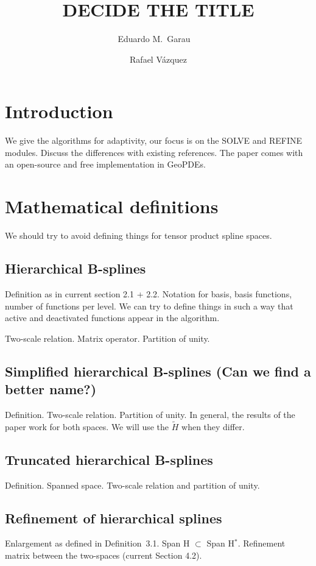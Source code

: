 \documentclass[a4paper]{siamltex1213}
\title{DECIDE THE TITLE}
\author{Eduardo M.~Garau\footnotemark[1]\ \footnotemark[2]\ \footnotemark[3] \and Rafael V\'azquez\footnotemark[1]}
\begin{document}
\maketitle

\renewcommand{\thefootnote}{\fnsymbol{footnote}}
\renewcommand{\thefootnote}{\arabic{footnote}}

\section{Introduction}
We give the algorithms for adaptivity, our focus is on the SOLVE and REFINE modules. Discuss the differences with existing references. The paper comes with an open-source and free implementation in GeoPDEs.

\section{Mathematical definitions}
We should try to avoid defining things for tensor product spline spaces.
\subsection{Hierarchical B-splines}
Definition as in current section 2.1 + 2.2. Notation for basis, basis functions, number of functions per level. We can try to define things in such a way that active and deactivated functions appear in the algorithm.

Two-scale relation. Matrix operator. Partition of unity.
\subsection{Simplified hierarchical B-splines (Can we find a better name?)}
Definition. Two-scale relation. Partition of unity. In general, the results of the paper work for both spaces. We will use the $\tilde H$ when they differ.

\subsection{Truncated hierarchical B-splines}
Definition. Spanned space. Two-scale relation and partition of unity.

\subsection{Refinement of hierarchical splines}
Enlargement as defined in Definition~3.1. Span H $\subset$ Span H$^*$. Refinement matrix between the two-spaces (current Section 4.2).
\end{document}
